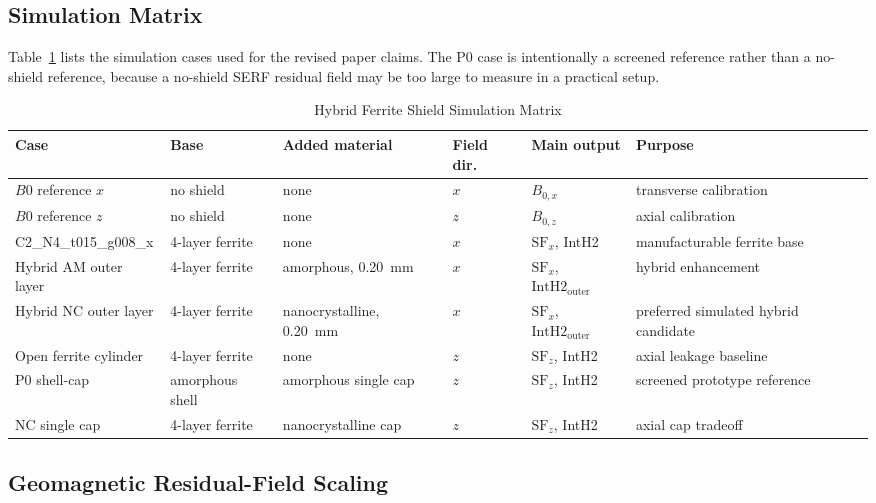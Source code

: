 \documentclass[letterpaper,journal]{IEEEtran}
\begin{document}
\subsection{Simulation Matrix}

Table~\ref{tab:matrix} lists the simulation cases used for the revised paper claims. The P0 case is intentionally a screened reference rather than a no-shield reference, because a no-shield SERF residual field may be too large to measure in a practical setup.

\begin{table}[!t]
\caption{Hybrid Ferrite Shield Simulation Matrix}
\label{tab:matrix}
\centering
\footnotesize
\setlength{\tabcolsep}{4pt}
\begin{tabular}{p{}p{}p{}p{}p{}p{}}
\toprule
Case & Base & Added material & Field dir. & Main output & Purpose \\
\midrule
$B0$ reference $x$ & no shield & none & $x$ & $B_{0,x}$ & transverse calibration \\
$B0$ reference $z$ & no shield & none & $z$ & $B_{0,z}$ & axial calibration \\
C2\_N4\_t015\_g008\_x & 4-layer ferrite & none & $x$ & $\mathrm{SF}_x$, IntH2 & manufacturable ferrite base \\
Hybrid AM outer layer & 4-layer ferrite & amorphous, \SI{0.20}{mm} & $x$ & $\mathrm{SF}_x$, $\mathrm{IntH2}_{\mathrm{outer}}$ & hybrid enhancement \\
Hybrid NC outer layer & 4-layer ferrite & nanocrystalline, \SI{0.20}{mm} & $x$ & $\mathrm{SF}_x$, $\mathrm{IntH2}_{\mathrm{outer}}$ & preferred simulated hybrid candidate \\
Open ferrite cylinder & 4-layer ferrite & none & $z$ & $\mathrm{SF}_z$, IntH2 & axial leakage baseline \\
P0 shell-cap & amorphous shell & amorphous single cap & $z$ & $\mathrm{SF}_z$, IntH2 & screened prototype reference \\
NC single cap & 4-layer ferrite & nanocrystalline cap & $z$ & $\mathrm{SF}_z$, IntH2 & axial cap tradeoff \\
\bottomrule
\end{tabular}
\end{table}

\subsection{Geomagnetic Residual-Field Scaling}
\end{document}
